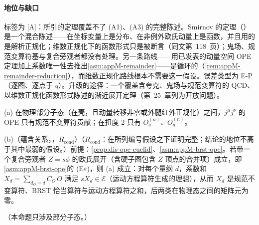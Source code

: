 \paragraph{地位与缺口}
标签为 [A]：所引的定理覆盖不了 (A1)、(A3) 的完整陈述。Smirnov 的定理（\cite[第~117~页]{Smirnov:1990rz}）是一个混合陈述——在坐标变量上是分布、在非例外欧氏动量上是函数，并且用的是解析正规化；维数正规化下的函数形式只是被断言（同文第~118~页）；鬼场、规范变算符基与复合旁观者都没有处理。另一条路线——用已发表的动量空间 OPE 定理加上系数唯一性去推出\cref{asm:appM-remainder}——是循环的（\cref{rem:appM-remainder-reduction}），而维数正规化路线根本不需要这一假设。误差类型为 E-P（逐图、逐点于 $q$）。升级的途径：一个覆盖含夸克、鬼场与规范变算符的 QCD、以维数正规化函数形式陈述的渐近展开定理（第~25~章列为开放问题）。

\begin{proposition}\label{prop:dis-ope-gi}
(a) 在物理部分子态（在壳，且动量转移非零或外腿红外正规化）之间，$j^\mu j^\nu$ 的 OPE 只有规范不变算符贡献；在扭度 2 只有 $O^{(n)}_q$、$O^{(n)}_g$。
\par
(b)（蕴含关系，\tagR，$R_{\mathrm{cond}}$）（$R_{\mathrm{cond}}$：在所列编号假设之下证明完整；结论的地位不高于其中最弱的假设。）前提：\cref{prop:dis-ope-euclid}、\cref{asm:appM-brst-ope}。若带一个复合旁观者 $Z=s\phi$ 的欧氏展开（含硬子图包含 $Z$ 顶点的合并项）成立，即\cref{asm:appM-brst-ope}的 (E$\varepsilon$)，则 (a) 成立：对每个量纲 $d$，系数和 $X_d=\sum_{d_O=d}C_O\,O$ 满足 $sX_d\in\mathcal E$（运动方程算符生成的理想），从而 $X_d$ 是规范不变算符、BRST 恰当算符与运动方程算符之和，后两类在物理态之间的矩阵元为零。
\par
（本命题只涉及部分子态。）
\end{proposition}

